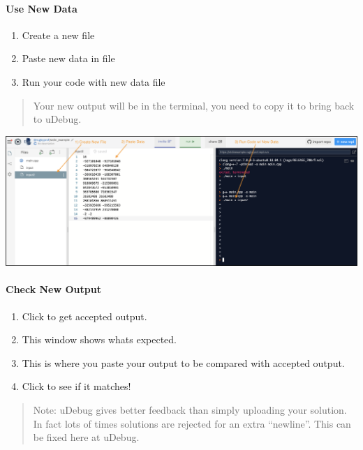 \hypertarget{use-new-data}{%
\paragraph{Use New Data}\label{use-new-data}}

\begin{enumerate}
\def\labelenumi{\arabic{enumi}.}
\tightlist
\item
  Create a new file
\item
  Paste new data in file
\item
  Run your code with new data file
\end{enumerate}

\begin{quote}
Your new output will be in the terminal, you need to copy it to bring
back to uDebug.
\end{quote}

\begin{center}
\includegraphics[scale=.3]{images/uhunt_rerun_newdata.png}
\end{center}

\hypertarget{check-new-output}{%
\paragraph{Check New Output}\label{check-new-output}}

\begin{enumerate}
\def\labelenumi{\arabic{enumi}.}
\tightlist
\item
  Click to get accepted output.
\item
  This window shows whats expected.
\item
  This is where you paste your output to be compared with accepted
  output.
\item
  Click to see if it matches!
\end{enumerate}

\begin{quote}
Note: uDebug gives better feedback than simply uploading your solution.
In fact lots of times solutions are rejected for an extra ``newline''.
This can be fixed here at uDebug.
\end{quote}


